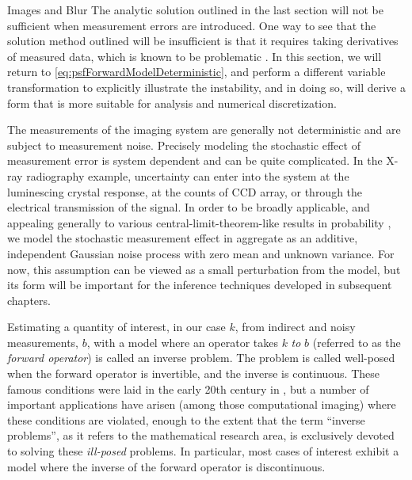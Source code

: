 \begin{chapter}{Images and Blur}
  The analytic solution outlined in the last section will not be sufficient when measurement errors are introduced. 
  One way to see that the solution method outlined will be insufficient is that it requires taking derivatives of measured data, which is known to be problematic \citep{hanke2001}.
  In this section, we will return to \eqref{eq:psfForwardModelDeterministic}, and perform a different variable transformation to explicitly illustrate the instability, and in doing so, will derive a form that is more suitable for analysis and numerical discretization.

  The measurements of the imaging system are generally not deterministic and are subject to measurement noise.
  Precisely modeling the stochastic effect of measurement error is system dependent and can be quite complicated.
  In the X-ray radiography example, uncertainty can enter into the system at the luminescing crystal response, at the counts of CCD array, or through the electrical transmission of the signal.
  In order to be broadly applicable, and appealing generally to various central-limit-theorem-like results in probability \citep{durrett2010probability}, we model the stochastic measurement effect in aggregate as an additive, independent Gaussian noise process with zero mean and unknown variance.  
  For now, this assumption can be viewed as a small perturbation from the model, but its form will be important for the inference techniques developed in subsequent chapters.

  Estimating a quantity of interest, in our case $k$, from indirect and noisy measurements, $b$, with a model where an operator takes $k$ \emph{to} $b$ (referred to as the \emph{forward operator}) is called an inverse problem.  
  The problem is called well-posed when the forward operator is invertible, and the inverse is continuous. %
  These famous conditions were laid in the early 20th century in \citep{hadamard1902}, but a number of important applications have arisen (among those computational imaging) where these conditions are violated, enough to the extent that the term ``inverse problems'', as it refers to the mathematical research area, is exclusively devoted to solving these \emph{ill-posed} problems.
  In particular, most cases of interest %
  exhibit a model where the inverse of the forward operator is discontinuous.


\end{chapter}
